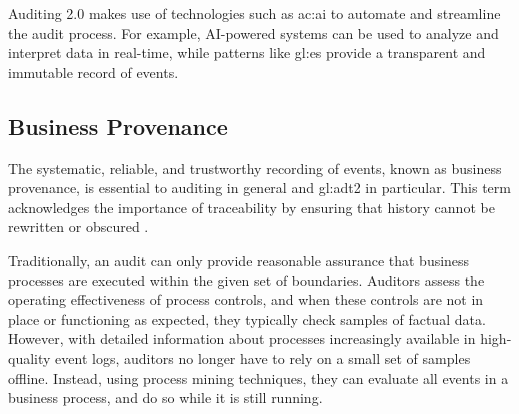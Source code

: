 


Auditing 2.0 makes use of technologies such as \gls{ac:ai} to automate and streamline the audit process. For example, AI-powered systems can be used to analyze and interpret data in real-time, while patterns like \gls{gl:es} provide a transparent and immutable record of events. 

\subsection{Business Provenance}\label{sec:bsprov}

The systematic, reliable, and trustworthy recording of events, known as business provenance, is essential to auditing in general and \gls{gl:adt2} in particular. This term acknowledges the importance of traceability by ensuring that history cannot be rewritten or obscured \citep{5427384}.

Traditionally, an audit can only provide reasonable assurance that business processes are executed within the given set of boundaries. Auditors assess the operating effectiveness of process controls, and when these controls are not in place or functioning as expected, they typically check samples of factual data. However, with detailed information about processes increasingly available in high-quality event logs, auditors no longer have to rely on a small set of samples offline. Instead, using process mining techniques, they can evaluate all events in a business process, and do so while it is still running.

